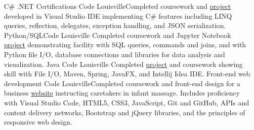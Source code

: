 {C\# .NET}
{Certifications}
{}
{Code Louisville}{Completed coursework and \href{https://github.com/jacobarchambault/jacobarchambault.codelou.exerciseproject}{project} developed in Visual Studio IDE implementing C\# features including LINQ queries, reflection, delegates, exception handling, and JSON serialization.}
{Python/SQL}{}{}{Code Louisville}
{Completed coursework and Jupyter Notebook \href{https://github.com/jacobarchambault/cpi-python}{project} demonstrating facility with SQL queries, commands and joins, 
	and with Python file I/O, database connections and libraries for data analysis and visualization.}
{Java}{}{}
{Code Louisville}
{Completed \href{https://github.com/jacobarchambault/codeloujava}{project} and coursework showing skill with 
	File I/O, Maven, Spring, JavaFX, and Intellij Idea IDE.}
{Front-end web development}{}{}
{Code Louisville}{Completed coursework and front-end design for a business \href{https://github.com/jacobarchambault/im-project}{website}  instructing caretakers in infant massage. Includes proficiency with Visual Studio Code, HTML5, CSS3, JavaScript, Git and GitHub, APIs and content delivery networks, Bootstrap and jQuery libraries, and the principles of responsive web design.}
